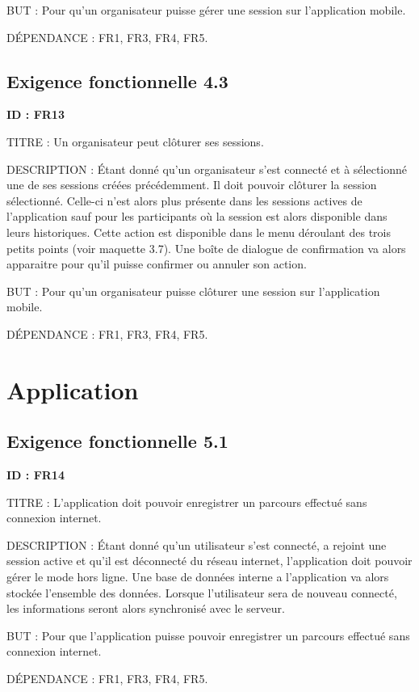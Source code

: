 \documentclass[titlepage, 12pt]{report}
\begin{document}
BUT : Pour qu'un organisateur puisse gérer une session sur l'application mobile.

DÉPENDANCE : FR1, FR3, FR4, FR5.

\subsection{Exigence fonctionnelle 4.3}

\textbf{ID : FR13}

TITRE : Un organisateur peut clôturer ses sessions.

DESCRIPTION : Étant donné qu'un organisateur s'est connecté et à sélectionné une de ses sessions créées précédemment. Il doit pouvoir clôturer la session sélectionné. Celle-ci n'est alors plus présente dans les sessions actives de l'application sauf pour les participants où la session est alors disponible dans leurs historiques. Cette action est disponible dans le menu déroulant des trois petits points (voir maquette 3.7). Une boîte de dialogue de confirmation va alors apparaitre pour qu'il puisse confirmer ou annuler son action.

BUT : Pour qu'un organisateur puisse clôturer une session sur l'application mobile.

DÉPENDANCE : FR1, FR3, FR4, FR5.

\section{Application}

\subsection{Exigence fonctionnelle 5.1}

\textbf{ID : FR14}

TITRE : L'application doit pouvoir enregistrer un parcours effectué sans connexion internet.

DESCRIPTION : Étant donné qu'un utilisateur s'est connecté, a rejoint une session active et qu'il est déconnecté du réseau internet, l'application doit pouvoir gérer le mode hors ligne. Une base de données interne a l'application va alors stockée l'ensemble des données. Lorsque l'utilisateur sera de nouveau connecté, les informations seront alors synchronisé avec le serveur.

BUT : Pour que l'application puisse pouvoir enregistrer un parcours effectué sans connexion internet. 

DÉPENDANCE : FR1, FR3, FR4, FR5.
\end{document}
